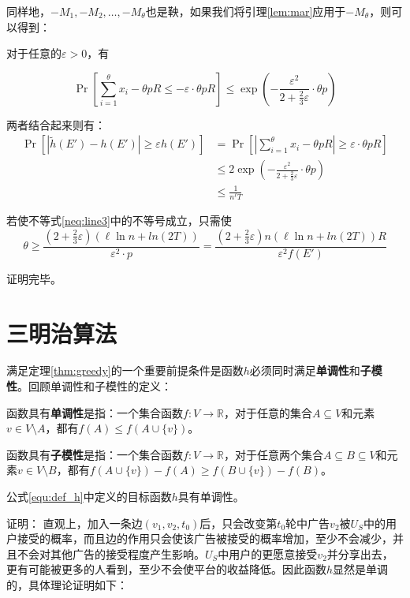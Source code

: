 同样地，$-M_1,-M_2,\ldots,-M_\theta$也是鞅，如果我们将引理\ref{lem:mar}应用于$-M_{\theta}$，则可以得到：

对于任意的$\varepsilon>0$，有

\begin{equation}
\Pr\left[\sum_{i=1}^{\theta}x_i- \theta pR \le - \varepsilon \cdot \theta p R\right] \le \exp(-\frac{\varepsilon^2}{2+\frac{2}{3}\varepsilon}\cdot \theta p)
\end{equation}

两者结合起来则有：
\begin{align}
    \Pr[|\tilde{h}(E')-h(E')|\ge \varepsilon h(E')] 
    &=\Pr\left[\left|\sum_{i=1}^{\theta}x_i- \theta pR \right|\ge \varepsilon \cdot \theta p R\right] \\ 
    & \le 2\exp(-\frac{\varepsilon^2}{2+\frac{2}{3}\varepsilon}\cdot \theta p) \\
    & \le \frac{1}{n^{\ell}T} \label{neq:line3}
\end{align}

若使不等式\ref{neq:line3}中的不等号成立，只需使
\begin{equation}
\theta \ge \frac{(2+\frac{2}{3}\varepsilon)(\ell\ln n+ln(2T))}{\varepsilon^2\cdot p}=\frac{(2+\frac{2}{3}\varepsilon)n(\ell\ln n+ln(2T)) R}{\varepsilon^2f(E')}
\end{equation}

\noindent 证明完毕。

\section{三明治算法}
\label{sec:sand}
满足定理\ref{thm:greedy}的一个重要前提条件是函数$h$必须同时满足{\bfseries 单调性}和{\bfseries 子模性}\cite{nemhauser1978analysis}。回顾单调性和子模性的定义：

函数具有{\bfseries 单调性}是指：一个集合函数$f:V\to \mathbb{R}$，对于任意的集合$A \subseteq V$和元素$v \in V\setminus A$，都有$f(A)\le f(A\cup\{v\})$。

函数具有{\bfseries 子模性}是指：一个集合函数$f:V\to \mathbb{R}$，对于任意两个集合$A\subseteq B \subseteq V$和元素$v \in V \setminus B$，都有$f(A \cup \{v\})-f(A) \ge f(B\cup \{v\})-f(B)$。
\begin{lemma}
\label{lem:h_mon}
公式\ref{equ:def_h}中定义的目标函数$h$具有单调性。
\end{lemma}
\noindent 证明：
直观上，加入一条边$(v_1,v_2,t_0)$后，只会改变第$t_0$轮中广告$v_2$被$U_S$中的用户接受的概率，而且边的作用只会使该广告被接受的概率增加，至少不会减少，并且不会对其他广告的接受程度产生影响。$U_S$中用户的更愿意接受$v_2$并分享出去，更有可能被更多的人看到，至少不会使平台的收益降低。因此函数$h$显然是单调的，具体理论证明如下：

